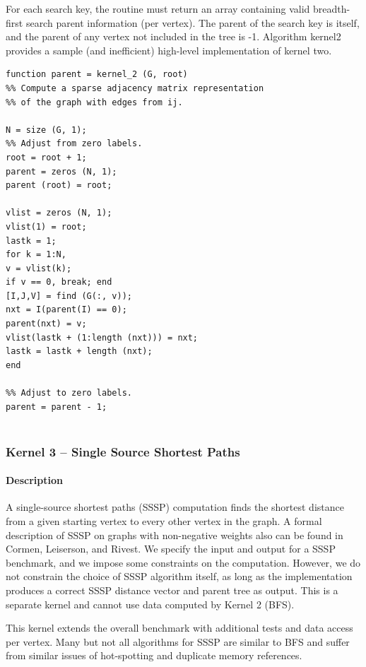\documentclass{article}
\begin{document}
For each search key, the routine must return an array containing valid breadth-first search parent information (per vertex). The parent of the search key is itself, and the parent of any vertex not included in the tree is -1. Algorithm kernel2 provides a sample (and inefficient) high-level implementation of kernel two.

\begin{lstlisting}
function parent = kernel_2 (G, root)
%% Compute a sparse adjacency matrix representation
%% of the graph with edges from ij.

N = size (G, 1);
%% Adjust from zero labels.
root = root + 1;
parent = zeros (N, 1);
parent (root) = root;

vlist = zeros (N, 1);
vlist(1) = root;
lastk = 1;
for k = 1:N,
v = vlist(k);
if v == 0, break; end
[I,J,V] = find (G(:, v));
nxt = I(parent(I) == 0);
parent(nxt) = v;
vlist(lastk + (1:length (nxt))) = nxt;
lastk = lastk + length (nxt);
end

%% Adjust to zero labels.
parent = parent - 1;


\end{lstlisting}

\subsubsection*{Kernel 3 -- Single Source Shortest Paths}

\paragraph*{Description}

A single-source shortest paths (SSSP) computation finds the shortest distance from a given starting vertex to every other vertex in the graph. A formal description of SSSP on graphs with non-negative weights also can be found in Cormen, Leiserson, and Rivest. We specify the input and output for a SSSP benchmark, and we impose some constraints on the computation. However, we do not constrain the choice of SSSP algorithm itself, as long as the implementation produces a correct SSSP distance vector and parent tree as output. This is a separate kernel and cannot use data computed by Kernel 2 (BFS).

This kernel extends the overall benchmark with additional tests and data access per vertex. Many but not all algorithms for SSSP are similar to BFS and suffer from similar issues of hot-spotting and duplicate memory references.
\end{document}
